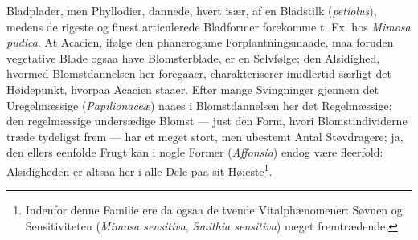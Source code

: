 \documentclass[12pt,a4paper]{book}
\begin{document}
Bladplader, men Phyllodier, dannede, hvert især, af en Bladstilk
(\textit{petiolus}), medens de rigeste og finest articulerede
Bladformer forekomme t. Ex. hos \textit{Mimosa pudica}. At Acacien,
ifølge den phanerogame Forplantningsmaade, maa foruden vegetative Blade
ogsaa have Blomsterblade, er en Selvfølge; den Alsidighed, hvormed
Blomstdannelsen her foregaaer, charakteriserer imidlertid særligt det
Høidepunkt, hvorpaa Acacien staaer. Efter mange Svingninger gjennem det
Uregelmæssige
\setcounter{footnote}{0}
(\textit{Papilionaceæ}) naaes i Blomstdannelsen her det Regelmæssige;
den regelmæssige undersædige Blomst --- just den Form, hvori
Blomstindividerne træde tydeligst frem --- har et meget stort, men
ubestemt Antal Støvdragere; ja, den ellers eenfolde Frugt kan i nogle
Former (\textit{Affonsia}) endog være fleerfold: Alsidigheden er altsaa
her i alle Dele paa sit Høieste\footnote{Indenfor denne Familie ere da
ogsaa de tvende Vitalphænomener: Søvnen og Sensitiviteten
(\textit{Mimosa sensitiva}, \textit{Smithia sensitiva}) meget
fremtrædende.}.
\end{document}
